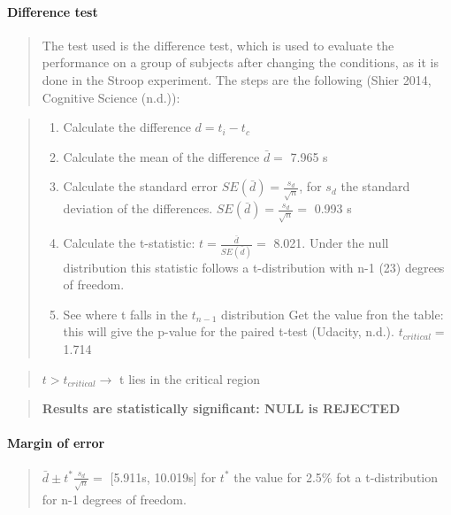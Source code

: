 \documentclass[]{article}
\providecommand{\tightlist}{%
  \setlength{\itemsep}{0pt}\setlength{\parskip}{0pt}}
\let\oldparagraph\paragraph
\renewcommand{\paragraph}[1]{\oldparagraph{#1}\mbox{}}
\begin{document}
\paragraph{\texorpdfstring{\textbf{Difference
test}}{Difference test}}\label{difference-test}

\begin{quote}
The test used is the difference test, which is used to evaluate the
performance on a group of subjects after changing the conditions, as it
is done in the Stroop experiment. The steps are the following (Shier
2014, Cognitive Science (n.d.)):
\end{quote}

\begin{quote}
\begin{enumerate}
\def\labelenumi{\arabic{enumi}.}
\tightlist
\item
  Calculate the difference \(d= t_i-t_c\)
\item
  Calculate the mean of the difference \(\bar{d}=\) 7.965 s
\item
  Calculate the standard error \(SE(\bar{d})= \frac{s_d}{\sqrt{n}}\),
  for \(s_d\) the standard deviation of the differences.
  \(SE(\bar{d})= \frac{s_d}{\sqrt{n}}=\) 0.993 s
\item
  Calculate the t-statistic: \(t=\frac{\bar{d}}{SE(\bar{d})}=\) 8.021.
  Under the null distribution this statistic follows a t-distribution
  with n-1 (23) degrees of freedom.
\item
  See where t falls in the \(t_{n-1}\) distribution Get the value fron
  the table: this will give the p-value for the paired t-test (Udacity,
  n.d.). \(t_{critical}=\) 1.714
\end{enumerate}
\end{quote}

\begin{quote}
\(t> t_{critical} \rightarrow\) t lies in the critical region
\end{quote}

\begin{quote}
\textbf{ Results are statistically significant: NULL is REJECTED }
\end{quote}

\paragraph{\texorpdfstring{\textbf{Margin of
error}}{Margin of error}}\label{margin-of-error}

\begin{quote}
\(\bar{d} \pm t^* \frac{s_d}{\sqrt{n}}=\) {[}5.911s, 10.019s{]} for
\(t^*\) the value for 2.5\% fot a t-distribution for n-1 degrees of
freedom.
\end{quote}
\end{document}
